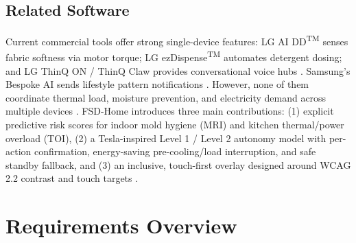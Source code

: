 \documentclass[conference]{IEEEtran}
\begin{document}
\subsection{Related Software}
Current commercial tools offer strong single-device features: LG AI DD\textsuperscript{TM} senses fabric softness via motor torque; LG ezDispense\textsuperscript{TM} automates detergent dosing; and LG ThinQ ON / ThinQ Claw provides conversational voice hubs \cite{lgwhitepaper2024, lgspec2026}. Samsung's Bespoke AI sends lifestyle pattern notifications \cite{samsung2026a, samsung2026b}. However, none of them coordinate thermal load, moisture prevention, and electricity demand across multiple devices \cite{yuan2024}. FSD-Home introduces three main contributions: (1) explicit predictive risk scores for indoor mold hygiene (MRI) and kitchen thermal/power overload (TOI), (2) a Tesla-inspired Level 1 / Level 2 autonomy model with per-action confirmation, energy-saving pre-cooling/load interruption, and safe standby fallback, and (3) an inclusive, touch-first overlay designed around WCAG 2.2 contrast and touch targets \cite{wcag2023}.

\section{Requirements Overview}
\end{document}
